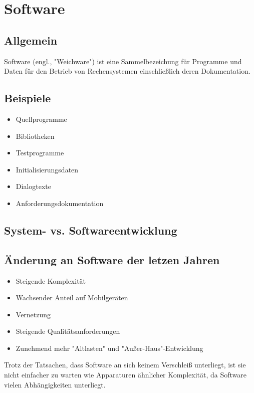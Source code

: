\section{Software}
\subsection{Allgemein}
Software (engl., "Weichware") ist eine Sammelbezeichung für Programme und Daten für den Betrieb von Rechensystemen einschließlich deren Dokumentation.

\subsection{Beispiele}
\begin{itemize}
    \item Quellprogramme
    \item Bibliotheken
    \item Testprogramme
    \item Initialisierungsdaten
    \item Dialogtexte
    \item Anforderungsdokumentation
\end{itemize}

\subsection{System- vs. Softwareentwicklung}


\subsection{Änderung an Software der letzen Jahren}
\begin{itemize}
    \item Steigende Komplexität 
    \item Wachsender Anteil auf Mobilgeräten
    \item Vernetzung
    \item Steigende Qualitätsanforderungen
    \item Zunehmend mehr "Altlasten" und "Außer-Haus"-Entwicklung
\end{itemize}
Trotz der Tatsachen, dass Software an sich keinem Verschleiß unterliegt, ist sie nicht einfacher zu warten wie Apparaturen ähnlicher Komplexität, da Software vielen Abhängigkeiten unterliegt.